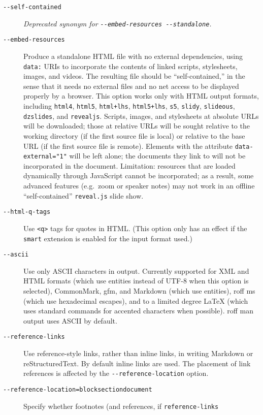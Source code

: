 \documentclass[
]{article}
\begin{document}
\begin{description}
\item[\texttt{-\/-self-contained}]
\emph{Deprecated synonym for
\texttt{-\/-embed-resources\ -\/-standalone}.}
\item[\texttt{-\/-embed-resources}]
Produce a standalone HTML file with no external dependencies, using
\texttt{data:} URIs to incorporate the contents of linked scripts,
stylesheets, images, and videos. The resulting file should be
``self-contained,'' in the sense that it needs no external files and no
net access to be displayed properly by a browser. This option works only
with HTML output formats, including \texttt{html4}, \texttt{html5},
\texttt{html+lhs}, \texttt{html5+lhs}, \texttt{s5}, \texttt{slidy},
\texttt{slideous}, \texttt{dzslides}, and \texttt{revealjs}. Scripts,
images, and stylesheets at absolute URLs will be downloaded; those at
relative URLs will be sought relative to the working directory (if the
first source file is local) or relative to the base URL (if the first
source file is remote). Elements with the attribute
\texttt{data-external="1"} will be left alone; the documents they link
to will not be incorporated in the document. Limitation: resources that
are loaded dynamically through JavaScript cannot be incorporated; as a
result, some advanced features (e.g.~zoom or speaker notes) may not work
in an offline ``self-contained'' \texttt{reveal.js} slide show.
\item[\texttt{-\/-html-q-tags}]
Use \texttt{\textless{}q\textgreater{}} tags for quotes in HTML. (This
option only has an effect if the \texttt{smart} extension is enabled for
the input format used.)
\item[\texttt{-\/-ascii}]
Use only ASCII characters in output. Currently supported for XML and
HTML formats (which use entities instead of UTF-8 when this option is
selected), CommonMark, gfm, and Markdown (which use entities), roff ms
(which use hexadecimal escapes), and to a limited degree LaTeX (which
uses standard commands for accented characters when possible). roff man
output uses ASCII by default.
\item[\texttt{-\/-reference-links}]
Use reference-style links, rather than inline links, in writing Markdown
or reStructuredText. By default inline links are used. The placement of
link references is affected by the \texttt{-\/-reference-location}
option.
\item[\texttt{-\/-reference-location=block}\textbar{}\texttt{section}\textbar{}\texttt{document}]
Specify whether footnotes (and references, if \texttt{reference-links}

\end{description}
\end{document}
